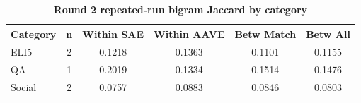 \begin{table}[htbp]
\centering
\caption{\textbf{Round 2 repeated-run bigram Jaccard by category}}
\label{tab:round2-repeated-bigram-by-category}
\renewcommand{\arraystretch}{1.4}
\begin{tabular}{|l|c|c|c|c|c|}
\hline
\textbf{Category} & \textbf{n} & \textbf{Within SAE} & \textbf{Within AAVE} & \textbf{Betw Match} & \textbf{Betw All} \\
\hline
ELI5 & 2 & 0.1218 & 0.1363 & 0.1101 & 0.1155 \\
\hline
QA & 1 & 0.2019 & 0.1334 & 0.1514 & 0.1476 \\
\hline
Social & 2 & 0.0757 & 0.0883 & 0.0846 & 0.0803 \\
\hline
\end{tabular}
\end{table}
